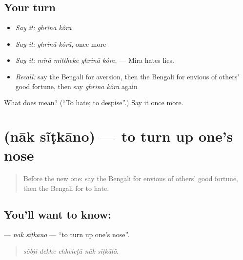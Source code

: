 \subsection*{Your turn}
\begin{itemize}
\raggedright
  \item \emph{Say it:} \emph{ghrinā kôrā}
  \item \emph{Say it:} \emph{ghrinā kôrā}, once more
  \item \emph{Say it:} \emph{mīrā mittheke ghrinā kôre.} — Mira hates lies.
  \item \emph{Recall:} say the Bengali for aversion, then the Bengali for envious of others' good fortune, then say \emph{ghrinā kôrā} again
\end{itemize}

\begin{tcolorbox}[breakable,colback=teal!4,colframe=teal!35!black,title={Before you move on}]
What does   mean? (\textquotedblleft{}To hate; to despise\textquotedblright{}.) Say it once more.
\end{tcolorbox}
\section[\texorpdfstring{\bn{নাক} \bn{সিঁটকানো} (nāk sĩṭkāno)}{নাক সিঁটকানো (nāk sĩṭkāno)}]{  (nāk sĩṭkāno) — to turn up one's nose}

\label{lesson:BN-C451-nak-sitkano}



\begin{quote}
Before the new one: say the Bengali for envious of others' good fortune, then the Bengali for to hate.
\end{quote}

\subsection*{You'll want to know:  }
\textbf{ } — \emph{nāk sĩṭkāno} — \textquotedblleft{}to turn up one's nose\textquotedblright{}.

\begin{quote}
    
\end{quote}

\begin{quote}
\emph{sôbji dekhe chheleṭā nāk sĩṭkālô.}
\end{quote}


